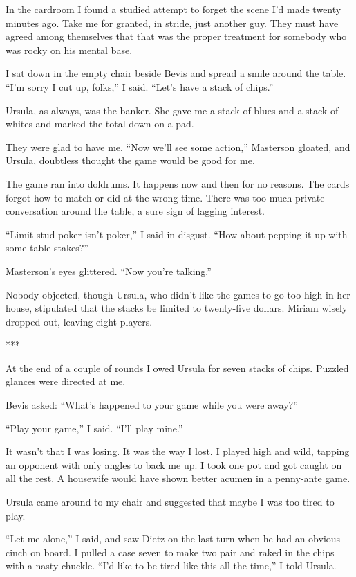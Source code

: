 {In the cardroom I found a studied attempt to forget the scene I’d made twenty minutes ago. Take me for granted, in stride, just another guy. They must have agreed among themselves that that was the proper treatment for somebody who was rocky on his mental base.

I sat down in the empty chair beside Bevis and spread a smile around the table. “I’m sorry I cut up, folks,” I said. “Let’s have a stack of chips.”

Ursula, as always, was the banker. She gave me a stack of blues and a stack of whites and marked the total down on a pad.

They were glad to have me. “Now we’ll see some action,” Masterson gloated, and Ursula, doubtless thought the game would be good for me.

The game ran into doldrums. It happens now and then for no reasons. The cards forgot how to match or did at the wrong time. There was too much private conversation around the table, a sure sign of lagging interest.

“Limit stud poker isn’t poker,” I said in disgust. “How about pepping it up with some table stakes?”

Masterson’s eyes glittered. “Now you’re talking.”

Nobody objected, though Ursula, who didn’t like the games to go too high in her house, stipulated that the stacks be limited to twenty-five dollars. Miriam wisely dropped out, leaving eight players.

***

At the end of a couple of rounds I owed Ursula for seven stacks of chips. Puzzled glances were directed at me.

Bevis asked: “What’s happened to your game while you were away?”

“Play your game,” I said. “I’ll play mine.”

It wasn’t that I was losing. It was the way I lost. I played high and wild, tapping an opponent with only angles to back me up. I took one pot and got caught on all the rest. A housewife would have shown better acumen in a penny-ante game.

Ursula came around to my chair and suggested that maybe I was too tired to play.

“Let me alone,” I said, and saw Dietz on the last turn when he had an obvious cinch on board. I pulled a case seven to make two pair and raked in the chips with a nasty chuckle. “I’d like to be tired like this all the time,” I told Ursula.

}
